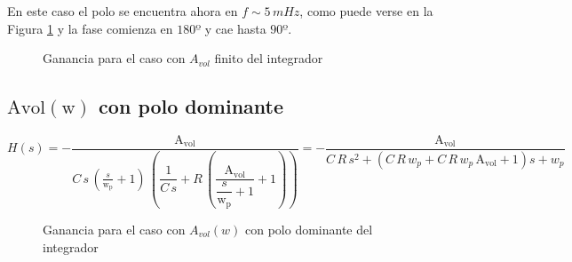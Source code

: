 En este caso el polo se encuentra ahora en $f \sim 5 \, mHz$, como puede verse en la Figura \ref{avolfinitointegrador} y la fase comienza en $180º$ y cae hasta $90º$.

\begin{figure}[H]
	\begin{center}
		\caption{Ganancia para el caso con $A_{vol}$ finito del integrador}
		\label{avolfinitointegrador}
	\end{center}
\end{figure}

\subsection{$\mathrm{A{vol}(w)}$ con polo dominante}
\begin{equation}
H(s)= -\frac{\mathrm{A_{vol}}}{C\,s\,\left(\frac{s}{\mathrm{w_p}}+1\right)\,\left(\dfrac{1}{C\,s}+R\,\left(\dfrac{\mathrm{A_{vol}}}{\dfrac{s}{\mathrm{w_p}}+1}+1\right)\right)}
= - \dfrac{\mathrm{A_{vol}}}{C\,R\,s^2+(C\,R\,w_p+C\,R\,w_p\,\mathrm{A_{vol}}+1)s+w_p}
\end{equation}

\begin{figure}[H]
	\begin{center}
		\caption{Ganancia para el caso con $A_{vol}(w)$ con polo dominante del integrador}
		\label{avolpolodominanteintegrador}
	\end{center}
\end{figure}

